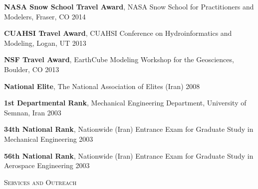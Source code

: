 \documentclass[10pt]{article}
\newenvironment{changemargin}[2]{%
  \begin{list}{}{%
 \setlength{\topsep}{0pt}%
 \setlength{\leftmargin}{#1}%
 \setlength{\rightmargin}{#2}%
 \setlength{\listparindent}{\parindent}%
 \setlength{\itemindent}{\parindent}%
 \setlength{\parsep}{\parskip}%
  }%
  \item[]}{\end{list}
}
\newcommand{\lineover}{
  \begin{changemargin}{-0.05in}{-0.05in}
  \vspace*{-8pt}
  \hrulefill \\
  \vspace*{-2pt}
  \end{changemargin}
}
\newcommand{\header}[1]{
  \begin{changemargin}{-0.5in}{-0.5in}
  \scshape{#1}\\
  \lineover
  \end{changemargin}
}
\newenvironment{body} {
  \vspace*{-2pt}
  \begin{changemargin}{-0.5in}{-0.5in}
}
{\end{changemargin}
}
\begin{document}
\begin{body}
  \textbf{NASA Snow School Travel Award},  NASA Snow School for Practitioners and Modelers, Fraser, CO \hfill {2014}\\
  \medskip

  \textbf{CUAHSI Travel Award}, CUAHSI Conference on Hydroinformatics and Modeling, Logan, UT \hfill {2013}\\
  \medskip

  \textbf{NSF Travel Award}, EarthCube Modeling Workshop for the Geosciences, Boulder, CO \hfill {2013}\\ \medskip

  \textbf{National Elite}, The National Association of Elites (Iran) \hfill {2008}\\ \medskip

  \textbf{1st Departmental Rank}, Mechanical Engineering Department, University of Semnan, Iran \hfill {2003}\\ \medskip

  \textbf{34th National Rank}, Nationwide (Iran) Entrance Exam for Graduate Study in Mechanical Engineering \hfill {2003}\\ \medskip

  \textbf{56th National Rank}, Nationwide (Iran) Entrance Exam for Graduate Study in Aerospace Engineering \hfill {2003}\\ \medskip

\end{body}
\medskip


\header{Services and Outreach}
\end{document}
